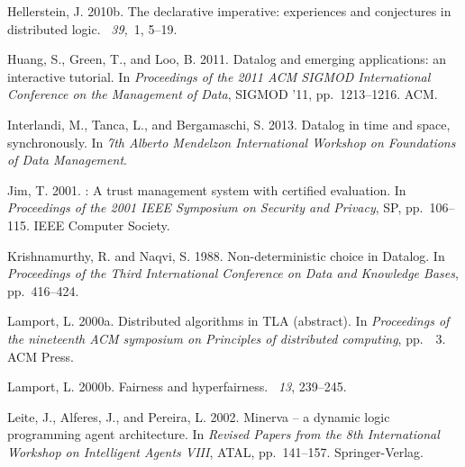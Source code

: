 \documentclass{tlp}
\begin{document}
\begin{thebibliography}{}
{\sc Hellerstein, J.} 2010b.
\newblock The declarative imperative: experiences and conjectures in
  distributed logic.
~{\em 39,\/}~1, 5--19.

{\sc Huang, S.}, {\sc Green, T.}, {\sc and} {\sc Loo, B.} 2011.
\newblock Datalog and emerging applications: an interactive tutorial.
\newblock In {\em Proceedings of the 2011 {ACM SIGMOD} International Conference
  on the Management of Data}, SIGMOD '11, pp.\  1213--1216. ACM.

{\sc Interlandi, M.}, {\sc Tanca, L.}, {\sc and} {\sc Bergamaschi, S.} 2013.
\newblock Datalog in time and space, synchronously.
\newblock In {\em 7th Alberto Mendelzon International Workshop on Foundations
  of Data Management}.

{\sc Jim, T.} 2001.
: A trust management system with certified evaluation.
\newblock In {\em Proceedings of the 2001 IEEE Symposium on Security and
  Privacy}, SP, pp.\  106--115. IEEE Computer Society.

{\sc Krishnamurthy, R.} {\sc and} {\sc Naqvi, S.} 1988.
\newblock Non-deterministic choice in {D}atalog.
\newblock In {\em Proceedings of the Third International Conference on Data and
  Knowledge Bases}, pp.\  416--424.

{\sc Lamport, L.} 2000a.
\newblock Distributed algorithms in {TLA} (abstract).
\newblock In {\em Proceedings of the nineteenth ACM symposium on Principles of
  distributed computing}, pp.\ ~3. ACM Press.

{\sc Lamport, L.} 2000b.
\newblock Fairness and hyperfairness.
~{\em 13}, 239--245.

{\sc Leite, J.}, {\sc Alferes, J.}, {\sc and} {\sc Pereira, L.} 2002.
\newblock Minerva -- a dynamic logic programming agent architecture.
\newblock In {\em Revised Papers from the 8th International Workshop on
  Intelligent Agents VIII}, ATAL, pp.\  141--157. Springer-Verlag.


\end{thebibliography}
\end{document}

